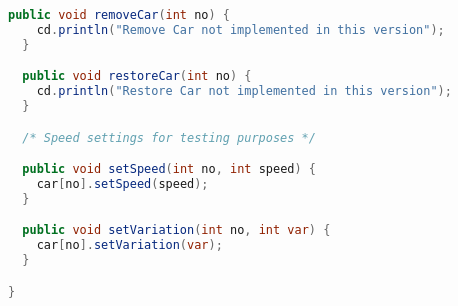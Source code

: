 \begin{lstlisting}[language=java]
  public void removeCar(int no) { 
    cd.println("Remove Car not implemented in this version");
  }

  public void restoreCar(int no) { 
    cd.println("Restore Car not implemented in this version");
  }

  /* Speed settings for testing purposes */

  public void setSpeed(int no, int speed) { 
    car[no].setSpeed(speed);
  }

  public void setVariation(int no, int var) { 
    car[no].setVariation(var);
  }

}
\end{lstlisting}